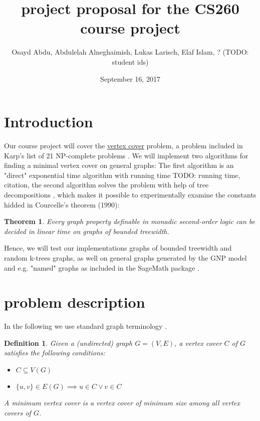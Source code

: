 \documentclass[11pt,a4paper]{article}
\title{project proposal for the CS260 course project}
\author{Osayd Abdu, Abdulelah Alneghaimish, Lukas Larisch, Elaf Islam, ? (TODO: student ids)}
\date{September 16, 2017}
\newtheorem*{definition}{Definition}
\newtheorem*{theorem}{Theorem}
\begin{document}
\maketitle

\section{Introduction}

Our course project will cover the \underline{vertex cover} problem, a problem included in Karp's list of 21 NP-complete  problems \cite{karp, wiki}. We will implement two algorithms for finding a minimal vertex cover on general graphs: The first algorithm is an "direct" exponential time algorithm with running time TODO: running time, citation, the second algorithm solves the problem with help of tree decompositions \cite{survey, graphminor, arnborg}, which makes it possible to experimentally examine the constants hidded in Courcelle's theorem (1990):

\begin{theorem}
Every graph property definable in monadic second-order logic can be decided in linear time on graphs of bounded treewidth.
\end{theorem}

Hence, we will test our implementations graphs of bounded treewidth and random k-trees graphs, as well on general graphs generated by the GNP model and  e.g. "named" graphs as included in the SageMath package \cite{sagemath}.

\section{problem description}

In the following we use standard graph terminology \cite{Diestel}.

\begin{definition}

Given a (undirected) graph $G = (V, E)$, a \emph{vertex cover} $C$ of $G$ satisfies the following conditions:

\begin{itemize}
\item $C \subseteq V(G)$ 
\item $\{u, v\} \in E(G) \implies u \in C \lor v \in C$ 
\end{itemize}

A \emph{minimum vertex cover} is a vertex cover of minimum size among all vertex covers of $G$.

\end{definition}
\end{document}
